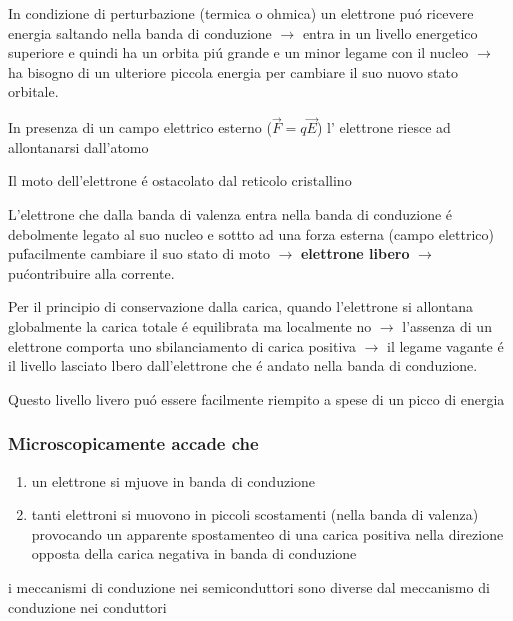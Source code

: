 \documentclass{article}
\begin{document}
In condizione di perturbazione (termica o ohmica) un elettrone pu\'o ricevere energia saltando nella banda di conduzione $\rightarrow$ entra in un livello energetico superiore e quindi ha un orbita pi\'u grande e un minor legame con il nucleo $\rightarrow$ ha bisogno di un ulteriore piccola energia per cambiare il suo nuovo stato orbitale.

In presenza di un campo elettrico esterno ($\overrightarrow{F}=q\overrightarrow{E}$) l' elettrone riesce ad allontanarsi dall'atomo

Il moto dell'elettrone \'e ostacolato dal reticolo cristallino

L'elettrone che dalla banda di valenza entra nella banda di conduzione \'e debolmente legato al suo nucleo e sottto ad una forza esterna (campo elettrico) pu\' facilmente cambiare il suo stato di moto $\rightarrow$ \textbf{elettrone libero} $\rightarrow$ pu\' contribuire alla corrente.

Per il principio di conservazione dalla carica, quando l'elettrone si allontana globalmente la carica totale \'e equilibrata ma localmente no $\rightarrow$ l'assenza di un elettrone comporta uno sbilanciamento di carica positiva $\rightarrow$ il legame vagante \'e il livello lasciato lbero dall'elettrone che \'e andato nella banda di conduzione.

Questo livello livero pu\'o essere facilmente riempito a spese di un picco di energia


\subsubsection{Microscopicamente accade che}
\begin{enumerate}
    \item un elettrone si mjuove in banda di conduzione
    \item tanti elettroni si muovono in piccoli scostamenti (nella banda di valenza) provocando un apparente spostamenteo di una carica positiva nella direzione opposta della carica negativa in banda di conduzione
\end{enumerate}

i meccanismi di conduzione nei semiconduttori sono diverse dal meccanismo di conduzione nei conduttori
\end{document}

